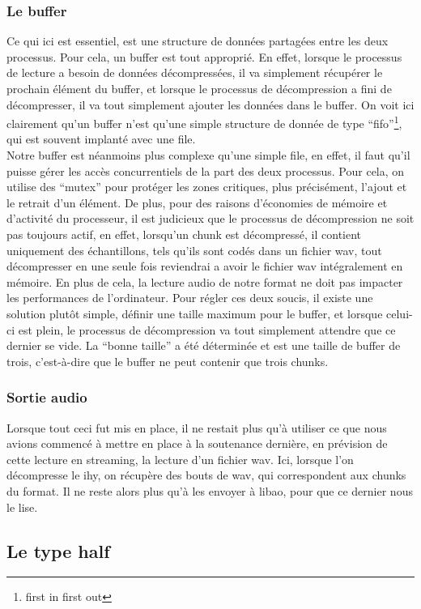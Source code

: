 \documentclass[a4paper,12pt]{article}
\begin{document}
		\subsubsection{Le buffer}
Ce qui ici est essentiel, est une structure de données partagées entre les
deux processus. Pour cela, un buffer est
tout approprié. En effet, lorsque le processus de lecture a besoin de données
décompressées, il va simplement récupérer le prochain élément du buffer, et
lorsque le processus de décompression a fini de décompresser, il va tout
simplement ajouter les données dans le buffer. On voit ici clairement qu'un
buffer n'est qu'une simple structure de donnée de type ``fifo''\footnote{first
in first out}, qui est souvent implanté avec une file.\\
Notre buffer est néanmoins plus complexe qu'une simple file, en effet, il faut
qu'il puisse gérer les accès concurrentiels de la part des deux processus. Pour
cela, on utilise des ``mutex'' pour protéger les zones critiques, plus
précisément, l'ajout et le retrait d'un élément. De plus, pour des raisons
d'économies de mémoire et d'activité du processeur, il est judicieux que le
processus de décompression ne
soit pas toujours actif, en effet, lorsqu'un chunk est décompressé, il contient
uniquement des échantillons, tels qu'ils sont codés dans un fichier wav, tout
décompresser en une seule fois reviendrai a avoir le fichier wav intégralement
en mémoire. En plus de cela, la lecture audio de notre format ne doit pas
impacter les performances de l'ordinateur. Pour régler ces deux soucis, il
existe une solution plutôt simple, définir une taille maximum pour le buffer, et
lorsque celui-ci est plein, le processus de décompression va tout simplement
attendre que ce dernier se vide. La ``bonne taille'' a été déterminée et est une
taille de buffer de trois, c'est-à-dire que le buffer ne peut contenir que
trois chunks.\\
		\subsubsection{Sortie audio}
Lorsque tout ceci fut mis en place, il ne restait plus qu'à utiliser ce que nous
avions commencé à mettre en place à la soutenance dernière, en prévision de
cette lecture en streaming, la lecture d'un fichier wav. Ici, lorsque l'on
décompresse le ihy, on récupère des bouts de wav, qui correspondent aux chunks
du format. Il ne reste alors plus qu'à les envoyer à libao, pour que ce dernier
nous le lise.
	\subsection{Le type half}
\end{document}
